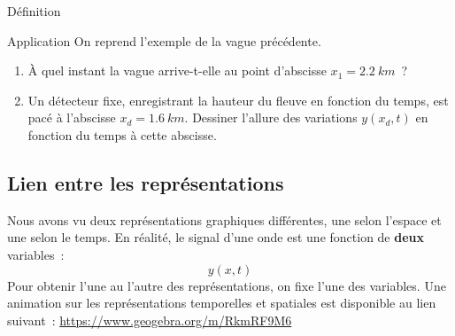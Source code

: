 \documentclass[../main/main.tex]{subfiles}
\begin{document}
\begin{bdefi}{Définition}
\end{bdefi}

\begin{rexem}{Application}
    On reprend l’exemple de la vague précédente.
    \begin{enumerate}
        \item À quel instant la vague arrive-t-elle au point d'abscisse $x_1 =
            \SI{2.2}{km}$~? \smallbreak
        \item Un détecteur fixe, enregistrant la hauteur du fleuve en fonction
            du temps, est pacé à l'abscisse $x_d = \SI{1.6}{km}$. Dessiner
            l'allure des variations $y(x_d,t)$ en fonction du temps à cette
            abscisse.
    \end{enumerate}
    {\vspace{2cm}}
\end{rexem}

\subsection{Lien entre les représentations}
Nous avons vu deux représentations graphiques différentes, une selon l'espace et
une selon le temps. En réalité, le signal d'une onde est une fonction de
\textbf{deux} variables~:
\[y(x,t)\]
Pour obtenir l'une au l'autre des représentations, on fixe l'une des variables.
Une animation sur les représentations temporelles et spatiales est disponible au
lien suivant~: \url{https://www.geogebra.org/m/RkmRF9M6}
\end{document}
